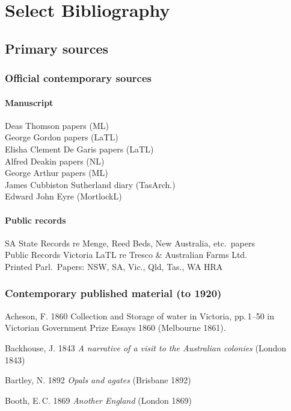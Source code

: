 
\chapter{Select Bibliography}


\section*{Primary sources}

\subsection*{Official contemporary sources}

\subsubsection*{Manuscript}
Deas Thomson papers (ML)\\
George Gordon papers (LaTL)\\
Elisha Clement De Garis papers (LaTL)\\
Alfred Deakin papers (NL)\\
George Arthur papers (ML)\\
James Cubbiston Sutherland diary (TasArch.)\\
Edward John Eyre (MortlockL)

\subsubsection*{Public records}
SA State Records re Menge, Reed Beds, New Australia, etc.\ papers\\
Public Records Victoria LaTL re Tresco \& Australian Farms Ltd.\\
Printed Parl.\ Papers: NSW, SA, Vic., Qld, Tas., WA HRA\\

\subsection*{Contemporary published material (to 1920)}
Acheson, F. 1860 Collection and Storage of water in Victoria,
pp.\,1--50 in Victorian Government Prize Essays 1860 (Melbourne 1861).

Backhouse, J. 1843 \textsl{A narrative of a visit to the Australian
colonies} (London 1843)

Bartley, N. 1892 \textsl{Opals and agates} (Brisbane 1892)

Booth, E.\,C. 1869 \textsl{Another England} (London 1869)

